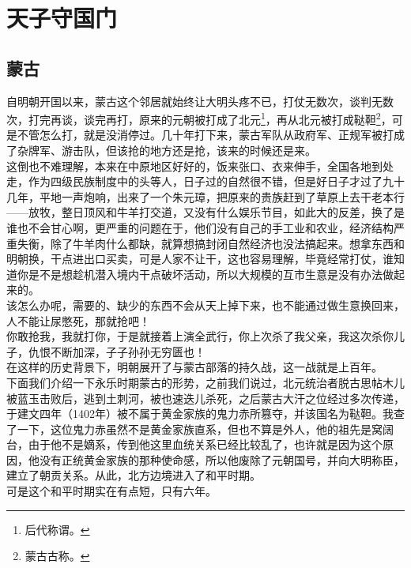 \section{天子守国门}
\ifnum{}
	\begin{multicols}{\theparacolNo}
\fi
\subsection{蒙古}
自明朝开国以来，蒙古这个邻居就始终让大明头疼不已，打仗无数次，谈判无数次，打完再谈，谈完再打，原来的元朝被打成了北元\footnote{后代称谓。}，再从北元被打成鞑靼\footnote{蒙古古称。}，可是不管怎么打，就是没消停过。几十年打下来，蒙古军队从政府军、正规军被打成了杂牌军、游击队，但该抢的地方还是抢，该来的时候还是来。\\

这倒也不难理解，本来在中原地区好好的，饭来张口、衣来伸手，全国各地到处走，作为四级民族制度中的头等人，日子过的自然很不错，但是好日子才过了九十几年，平地一声炮响，出来了一个朱元璋，把原来的贵族赶到了草原上去干老本行——放牧，整日顶风和牛羊打交道，又没有什么娱乐节目，如此大的反差，换了是谁也不会甘心啊，更严重的问题在于，他们没有自己的手工业和农业，经济结构严重失衡，除了牛羊肉什么都缺，就算想搞封闭自然经济也没法搞起来。想拿东西和明朝换，干点进出口买卖，可是人家不让干，这也容易理解，毕竟经常打仗，谁知道你是不是想趁机潜入境内干点破坏活动，所以大规模的互市生意是没有办法做起来的。\\

该怎么办呢，需要的、缺少的东西不会从天上掉下来，也不能通过做生意换回来，人不能让尿憋死，那就抢吧！\\

你敢抢我，我就打你，于是就接着上演全武行，你上次杀了我父亲，我这次杀你儿子，仇恨不断加深，子子孙孙无穷匮也！\\

在这样的历史背景下，明朝展开了与蒙古部落的持久战，这一战就是上百年。\\

下面我们介绍一下永乐时期蒙古的形势，之前我们说过，北元统治者脱古思帖木儿被蓝玉击败后，逃到土刺河，被也速迭儿杀死，之后蒙古大汗之位经过多次传递，于建文四年（1402年）被不属于黄金家族的鬼力赤所篡夺，并该国名为鞑靼。我查了一下，这位鬼力赤虽然不是黄金家族直系，但也不算是外人，他的祖先是窝阔台，由于他不是嫡系，传到他这里血统关系已经比较乱了，也许就是因为这个原因，他没有正统黄金家族的那种使命感，所以他废除了元朝国号，并向大明称臣，建立了朝贡关系。从此，北方边境进入了和平时期。\\

可是这个和平时期实在有点短，只有六年。\\


\end{multicols}
